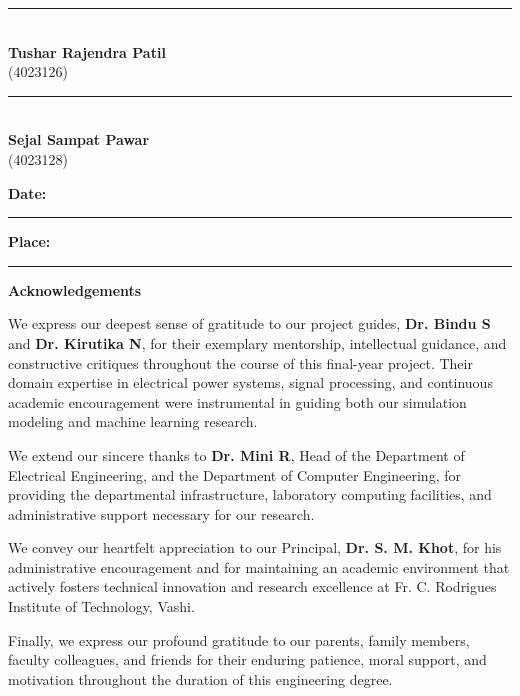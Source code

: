 \documentclass[12pt,a4paper]{report}
\begin{document}
\vspace{2.5cm}

\noindent
\begin{minipage}[t]{0.45\textwidth}
\centering
\rule{6cm}{0.4pt} \\[0.2cm]
\textbf{Tushar Rajendra Patil} \\
(4023126)
\end{minipage}
\hfill
\begin{minipage}[t]{0.45\textwidth}
\centering
\rule{6cm}{0.4pt} \\[0.2cm]
\textbf{Sejal Sampat Pawar} \\
(4023128)
\end{minipage}

\vspace{1.5cm}
\noindent
\textbf{Date:} \rule{4cm}{0.4pt} \hfill \textbf{Place:} \rule{4cm}{0.4pt}
\clearpage

\begin{center}
    \vspace*{1.5cm}
    \textbf{\LARGE Acknowledgements}\\[1.5cm]
\end{center}
We express our deepest sense of gratitude to our project guides, \textbf{Dr. Bindu S} and \textbf{Dr. Kirutika N}, for their exemplary mentorship, intellectual guidance, and constructive critiques throughout the course of this final-year project. Their domain expertise in electrical power systems, signal processing, and continuous academic encouragement were instrumental in guiding both our simulation modeling and machine learning research.

We extend our sincere thanks to \textbf{Dr. Mini R}, Head of the Department of Electrical Engineering, and the Department of Computer Engineering, for providing the departmental infrastructure, laboratory computing facilities, and administrative support necessary for our research.

We convey our heartfelt appreciation to our Principal, \textbf{Dr. S. M. Khot}, for his administrative encouragement and for maintaining an academic environment that actively fosters technical innovation and research excellence at Fr. C. Rodrigues Institute of Technology, Vashi.

Finally, we express our profound gratitude to our parents, family members, faculty colleagues, and friends for their enduring patience, moral support, and motivation throughout the duration of this engineering degree.
\clearpage
\end{document}

